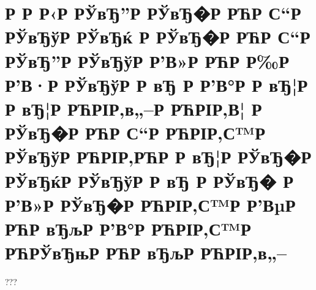 \documentclass[a4paper,14pt]{extarticle}
\begin{document}
\section{Р  Р Р‹Р  РЎвЂ”Р  РЎвЂ�Р РЋР С“Р  РЎвЂўР  РЎвЂќ Р  РЎвЂ�Р РЋР С“Р  РЎвЂ”Р  РЎвЂўР  Р’В»Р РЋР Р‰Р  Р’В·Р  РЎвЂўР  Р вЂ Р  Р’В°Р  Р вЂ¦Р  Р вЂ¦Р РЋРІР‚в„–Р РЋРІР‚В¦ Р  РЎвЂ�Р РЋР С“Р РЋРІР‚С™Р  РЎвЂўР РЋРІР‚РЋР  Р вЂ¦Р  РЎвЂ�Р  РЎвЂќР  РЎвЂўР  Р вЂ  Р  РЎвЂ� Р  Р’В»Р  РЎвЂ�Р РЋРІР‚С™Р  Р’ВµР РЋР вЂљР  Р’В°Р РЋРІР‚С™Р РЋРЎвЂњР РЋР вЂљР РЋРІР‚в„–}
	???
\clearpage



\end{document}

